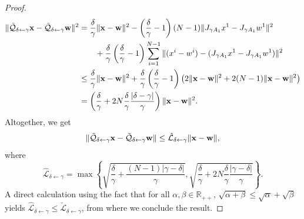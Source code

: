 \documentclass[10pt,a4paper]{amsart}
\begin{document}
\begin{proof}
\begin{align*}
    \|\mathcal{\Tilde{Q}}_{\delta\gets\gamma}\mathbf{x}-\mathcal{\Tilde{Q}}_{\delta\gets\gamma}\mathbf{w}\|^2
    &= \frac{\delta}{\gamma}\|\mathbf{x}-\mathbf{w}\|^2-\left(\frac{\delta}{\gamma}-1\right)(N-1)\|J_{\gamma A_1}x^1-J_{\gamma A_1}w^1\|^2 \\
    &\qquad + \frac{\delta}{\gamma}\left(\frac{\delta}{\gamma}-1\right)\sum_{i=1}^{N-1}\|(x^i-w^i)-(J_{\gamma A_1}x^1-J_{\gamma A_1}w^1)\|^2\\
    &\leq \frac{\delta}{\gamma}\|\mathbf{x}-\mathbf{w}\|^2 + \frac{\delta}{\gamma}\left(\frac{\delta}{\gamma}-1\right)\left(2\|\mathbf{x}-\mathbf{w}\|^2+2(N-1)\|\mathbf{x}-\mathbf{w}\|^2\right)\\
    &= \left(\frac{\delta}{\gamma}+2N\frac{\delta}{\gamma}\frac{|\delta-\gamma|}{\gamma}\right)\|\mathbf{x}-\mathbf{w}\|^2.
\end{align*}
Altogether, we get \begin{equation*}
        \|\mathcal{\Tilde{Q}}_{\delta\gets\gamma}\mathbf{x}-\mathcal{\Tilde{Q}}_{\delta\gets\gamma}\mathbf{w}\|\leq \hat{\mathcal{L}}_{\delta\gets\gamma}\|\mathbf{x}-\mathbf{w}\|,
    \end{equation*} where \begin{equation*}
        \hat{\mathcal{L}}_{\delta\gets\gamma}=\max\left\{ \sqrt{\frac{\delta}{\gamma} + \frac{(N-1)|\gamma-\delta|}{\gamma}}, \sqrt{\frac{\delta}{\gamma} + 2N \frac{\delta}{\gamma}\frac{|\gamma-\delta|}{\gamma}}\right\}.
    \end{equation*} A direct calculation using the fact that for all $\alpha,\beta \in \mathbb{R}_{++}$, $\sqrt{\alpha + \beta} \leq \sqrt{\alpha} + \sqrt{\beta} $ yields $\hat{\mathcal{L}}_{\delta\gets\gamma} \leq \check{\mathcal{L}}_{\delta\gets\gamma}$, from where we conclude the result.
\end{proof}
\end{document}
